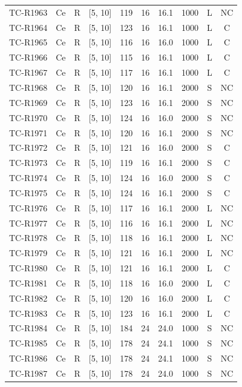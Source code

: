 \begin{longtable}{lccccccccc}
TC-R1963 & Ce & R & [5, 10] & 119 & 16 & 16.1 & 1000 & L & NC \\
TC-R1964 & Ce & R & [5, 10] & 123 & 16 & 16.1 & 1000 & L & C \\
TC-R1965 & Ce & R & [5, 10] & 116 & 16 & 16.0 & 1000 & L & C \\
TC-R1966 & Ce & R & [5, 10] & 115 & 16 & 16.1 & 1000 & L & C \\
TC-R1967 & Ce & R & [5, 10] & 117 & 16 & 16.1 & 1000 & L & C \\
TC-R1968 & Ce & R & [5, 10] & 120 & 16 & 16.1 & 2000 & S & NC \\
TC-R1969 & Ce & R & [5, 10] & 123 & 16 & 16.1 & 2000 & S & NC \\
TC-R1970 & Ce & R & [5, 10] & 124 & 16 & 16.0 & 2000 & S & NC \\
TC-R1971 & Ce & R & [5, 10] & 120 & 16 & 16.1 & 2000 & S & NC \\
TC-R1972 & Ce & R & [5, 10] & 121 & 16 & 16.0 & 2000 & S & C \\
TC-R1973 & Ce & R & [5, 10] & 119 & 16 & 16.1 & 2000 & S & C \\
TC-R1974 & Ce & R & [5, 10] & 124 & 16 & 16.0 & 2000 & S & C \\
TC-R1975 & Ce & R & [5, 10] & 124 & 16 & 16.1 & 2000 & S & C \\
TC-R1976 & Ce & R & [5, 10] & 117 & 16 & 16.1 & 2000 & L & NC \\
TC-R1977 & Ce & R & [5, 10] & 116 & 16 & 16.1 & 2000 & L & NC \\
TC-R1978 & Ce & R & [5, 10] & 118 & 16 & 16.1 & 2000 & L & NC \\
TC-R1979 & Ce & R & [5, 10] & 121 & 16 & 16.1 & 2000 & L & NC \\
TC-R1980 & Ce & R & [5, 10] & 121 & 16 & 16.1 & 2000 & L & C \\
TC-R1981 & Ce & R & [5, 10] & 118 & 16 & 16.0 & 2000 & L & C \\
TC-R1982 & Ce & R & [5, 10] & 120 & 16 & 16.0 & 2000 & L & C \\
TC-R1983 & Ce & R & [5, 10] & 123 & 16 & 16.1 & 2000 & L & C \\
TC-R1984 & Ce & R & [5, 10] & 184 & 24 & 24.0 & 1000 & S & NC \\
TC-R1985 & Ce & R & [5, 10] & 178 & 24 & 24.1 & 1000 & S & NC \\
TC-R1986 & Ce & R & [5, 10] & 178 & 24 & 24.1 & 1000 & S & NC \\
TC-R1987 & Ce & R & [5, 10] & 178 & 24 & 24.0 & 1000 & S & NC \\

\end{longtable}
